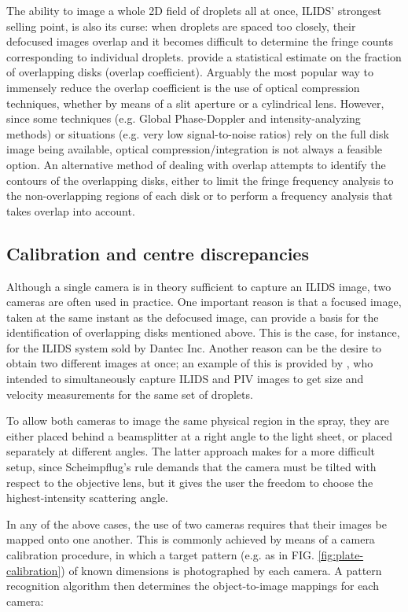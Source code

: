 \documentclass[floatfix,aip,rsi,reprint,graphicx]{revtex4-1}
\begin{document}
The ability to image a whole 2D field of droplets all at once, ILIDS' strongest
selling point, is also its curse: when droplets are spaced too closely, their
defocused images overlap and it becomes difficult to determine the fringe counts
corresponding to individual droplets. \citet{Damaschke02} provide a statistical
estimate on the fraction of overlapping disks (overlap coefficient). Arguably
the most popular way to immensely reduce the overlap coefficient is the use of
optical compression techniques, whether by means of a slit aperture\cite{Pan06}
or a cylindrical lens\cite{Kawaguchi02, Maeda02}. However, since some techniques
(e.g. Global Phase-Doppler\cite{Damaschke01} and intensity-analyzing
methods\cite{Querel10}) or situations (e.g. very low signal-to-noise ratios)
rely on the full disk image being available, optical compression/integration is
not always a feasible option. An alternative method of dealing with overlap
attempts to identify the contours of the overlapping disks, either to limit the
fringe frequency analysis to the non-overlapping regions of each disk or to
perform a frequency analysis that takes overlap into account.

\subsection{Calibration and centre discrepancies}

Although a single camera is in theory sufficient to capture an ILIDS image, two
cameras are often used in practice. One important reason is that a focused
image, taken at the same instant as the defocused image, can provide a basis for
the identification of overlapping disks mentioned above. This is the case, for
instance, for the ILIDS system sold by Dantec Inc. Another reason can be the
desire to obtain two different images at once; an example of this is provided by
\citet{Hardalupas10}, who intended to simultaneously capture ILIDS and PIV
images to get size and velocity measurements for the same set of droplets.

To allow both cameras to image the same physical region in the spray, they are
either placed behind a beamsplitter at a right angle to the light sheet, or
placed separately at different angles. The latter approach makes for a more
difficult setup, since Scheimpflug's rule demands that the camera must be tilted
with respect to the objective lens, but it gives the user the freedom to choose
the highest-intensity scattering angle.

In any of the above cases, the use of two cameras requires that their images be
mapped onto one another. This is commonly achieved by means of a camera
calibration procedure, in which a target pattern (e.g. as in FIG.
\ref{fig:plate-calibration}) of known dimensions is
photographed by each camera. A pattern recognition algorithm then determines the
object-to-image mappings for each camera:
\end{document}
